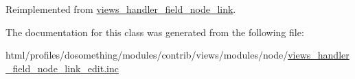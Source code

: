 Reimplemented from \hyperlink{classviews__handler__field__node__link}{views\_\-handler\_\-field\_\-node\_\-link}.

The documentation for this class was generated from the following file:\begin{DoxyCompactItemize}
\item 
html/profiles/dosomething/modules/contrib/views/modules/node/\hyperlink{views__handler__field__node__link__edit_8inc}{views\_\-handler\_\-field\_\-node\_\-link\_\-edit.inc}\end{DoxyCompactItemize}

